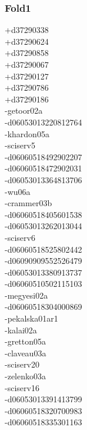 \begin{multicols}{3}
\subsubsection*{Fold1}
+d37290338\\
+d37290624\\
+d37290858\\
+d37290067\\
+d37290127\\
+d37290786\\
+d37290186\\
-getoor02a\\
-d06053013220812764\\
-khardon05a\\
-sciserv5\\
-d06060518492902207\\
-d06060518472902031\\
-d06053013364813706\\
-wu06a\\
-crammer03b\\
-d06060518405601538\\
-d06053013262013044\\
-sciserv6\\
-d06060518525802442\\
-d06090909552526479\\
-d06053013380913737\\
-d06060510502115103\\
-megyesi02a\\
-d06060518304000869\\
-pekalska01ar1\\
-kalai02a\\
-gretton05a\\
-claveau03a\\
-sciserv20\\
-zelenko03a\\
-sciserv16\\
-d06053013391413799\\
-d06060518320700983\\
-d06060518335301163\\

\end{multicols}
